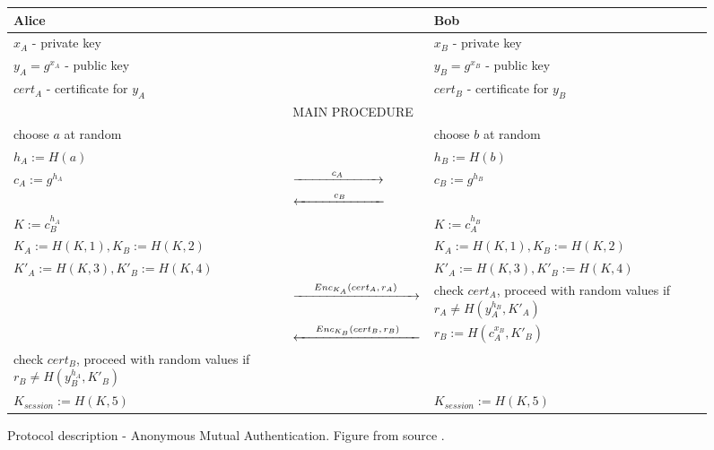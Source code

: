 \documentclass[11pt,titlepage]{article}
\theoremstyle{plain}
\begin{document}
\newcommand{\newCA}{$c_A$}
\newcommand{\newCB}{$c_B$}
\newcommand{\newEncA}{$Enc_{K_A}(cert_A,r_A)$}
\newcommand{\newEncB}{$Enc_{K_B}(cert_B,r_B)$}
\begin{figure}[H]

\begin{table}[H]
	\centering
	\begin{tabular}{ | p{6.5cm} p{3.5cm} p{6.5cm} | }
		\hline
		Alice &  & Bob \\
		\hline
		$x_A$ - private key & & $x_B$ - private key \\
		$y_A = g^{x_A}$ - public key & & $y_B = g^{x_B}$ - public key \\
		$cert_A$ - certificate for $y_A$ & & $cert_B$ - certificate for $y_B$ \\
		\hline
		& MAIN PROCEDURE & \\
		\hline
		choose $a$ at random & & choose $b$ at random \\
		$h_A := H(a)$ & & $h_B := H(b)$ \\
		$c_A := g^{h_A}$ & $\xrightarrow{\text{\hspace{1cm}\text{\newCA}\hspace{1cm}}}$ & $c_B := g^{h_B}$ \\
		& $\xleftarrow{\text{\hspace{1cm}\text{\newCB}\hspace{1cm}}}$ & \\
		$K := c^{h_A}_{B}$ & & $K := c_{A}^{h_B}$ \\
		$K_A := H(K,1), K_B := H(K,2)$ & & $K_A := H(K,1), K_B := H(K,2)$  \\
		$K'_A := H(K,3), K'_B := H(K,4)$ & & $K'_A := H(K,3), K'_B := H(K,4)$ \\
		& $\xrightarrow{\text{\hspace{0.5cm}\text{\newEncA}\hspace{0.5cm}}}$ & check $cert_A$, proceed with random values if $r_A \neq H(y_{A}^{h_B}, K'_A)$ \\
		& $\xleftarrow{\text{\hspace{0.5cm}\text{\newEncB}\hspace{0.5cm}}}$ & $r_B := H(c_{A}^{x_B},K'_B)$ \\
		check $cert_B$, proceed with random values if $r_B \neq H(y_{B}^{h_A}, K'_B)$ & & \\
		$K_{session}:= H(K,5)$ & & $K_{session}:= H(K,5)$ \\
		\hline
	\end{tabular}
	\label{tab:singlebest}
		
\end{table}
\caption{Protocol description - Anonymous Mutual Authentication. Figure from source \cite{AMA}.}
\end{figure}
\end{document}
